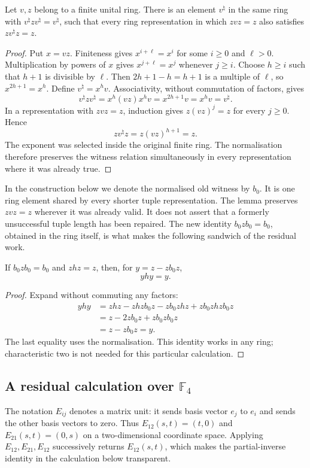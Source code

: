 \begin{lemma}\label{tx:lem:normal}
Let $v,z$ belong to a finite unital ring. There is an element
$v^\natural$ in the same ring with
$v^\natural z v^\natural=v^\natural$, such that every ring
representation in which $zvz=z$ also satisfies
$zv^\natural z=z$.
\end{lemma}
\begin{proof}
Put $x=vz$. Finiteness gives $x^{i+\ell}=x^i$ for some $i\ge0$
and $\ell>0$. Multiplication by powers of $x$ gives
$x^{j+\ell}=x^j$ whenever $j\ge i$. Choose $h\ge i$ such that
$h+1$ is divisible by $\ell$. Then $2h+1-h=h+1$ is a multiple
of $\ell$, so $x^{2h+1}=x^h$. Define $v^\natural=x^hv$.
Associativity, without commutation of factors, gives
\[
 v^\natural z v^\natural
      =x^h(vz)x^hv=x^{2h+1}v=x^hv=v^\natural.
\]
In a representation with $zvz=z$, induction gives
$z(vz)^j=z$ for every $j\ge0$. Hence
\[
                     zv^\natural z=z(vz)^{h+1}=z.
\]
The exponent was selected inside the original finite ring. The
normalisation therefore preserves the witness relation simultaneously
in every representation where it was already true.
\end{proof}
In the construction below we denote the normalised old witness by $b_0$. It is one ring element shared by every shorter tuple representation.
The lemma preserves $zvz=z$ wherever it was already valid. It does
not assert that a formerly unsuccessful tuple length has been repaired.
The new identity $b_0zb_0=b_0$, obtained in the ring itself, is what
makes the following sandwich of the residual work.

\begin{lemma}\label{tx:lem:residual}
If $b_0zb_0=b_0$ and $zhz=z$, then, for $y=z-zb_0z$,
\[yhy=y.\]
\end{lemma}
\begin{proof}
Expand without commuting any factors:
\begin{align*}
yhy&=zhz-zhzb_0z-zb_0zhz+zb_0zhzb_0z\\
&=z-2zb_0z+zb_0zb_0z\\
&=z-zb_0z=y.
\end{align*}
The last equality uses the normalisation. This identity works in any ring; characteristic two is not needed for this particular calculation.
\end{proof}

\subsection{A residual calculation over \texorpdfstring{$\mathbb F_4$}{F4}}
The notation $E_{ij}$ denotes a matrix unit: it sends basis vector
$e_j$ to $e_i$ and sends the other basis vectors to zero. Thus
$E_{12}(s,t)=(t,0)$ and $E_{21}(s,t)=(0,s)$ on a two-dimensional
coordinate space. Applying $E_{12},E_{21},E_{12}$ successively
returns $E_{12}(s,t)$, which makes the partial-inverse identity
in the calculation below transparent.

